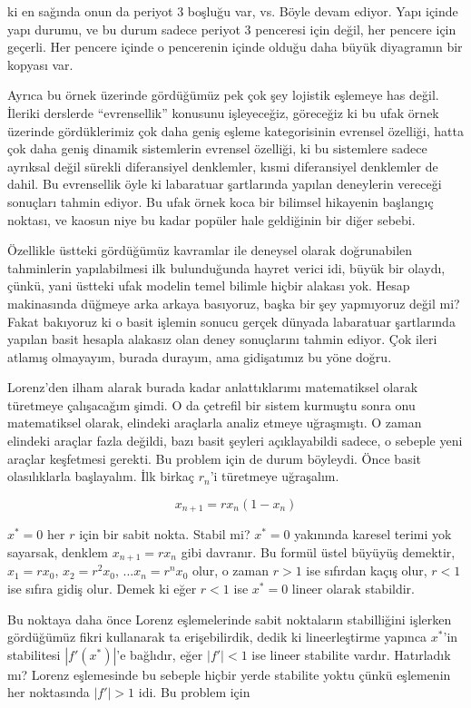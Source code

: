 \documentclass[12pt,fleqn]{article}\usepackage{../../common}
\begin{document}
ki en sağında onun da periyot 3 boşluğu var, vs. Böyle devam ediyor. Yapı
içinde yapı durumu, ve bu durum sadece periyot 3 penceresi için değil, her
pencere için geçerli. Her pencere içinde o pencerenin içinde olduğu daha
büyük diyagramın bir kopyası var. 

Ayrıca bu örnek üzerinde gördüğümüz pek çok şey lojistik eşlemeye has
değil. İleriki derslerde ``evrensellik'' konusunu işleyeceğiz, göreceğiz ki
bu ufak örnek üzerinde gördüklerimiz çok daha geniş eşleme kategorisinin
evrensel özelliği, hatta çok daha geniş dinamik sistemlerin evrensel
özelliği, ki bu sistemlere sadece ayrıksal değil sürekli diferansiyel
denklemler, kısmi diferansiyel denklemler de dahil. Bu evrensellik öyle ki
labaratuar şartlarında yapılan deneylerin vereceği sonuçları tahmin
ediyor. Bu ufak örnek koca bir bilimsel hikayenin başlangıç noktası, ve
kaosun niye bu kadar popüler hale geldiğinin bir diğer sebebi. 

Özellikle üstteki gördüğümüz kavramlar ile deneysel olarak doğrunabilen
tahminlerin yapılabilmesi ilk bulunduğunda hayret verici idi, büyük bir
olaydı, çünkü, yani üstteki ufak modelin temel bilimle hiçbir alakası
yok. Hesap makinasında düğmeye arka arkaya basıyoruz, başka bir şey
yapmıyoruz değil mi? Fakat bakıyoruz ki o basit işlemin sonucu gerçek
dünyada labaratuar şartlarında yapılan basit hesapla alakasız olan deney
sonuçlarını tahmin ediyor. Çok ileri atlamış olmayayım, burada durayım, ama
gidişatımız bu yöne doğru.

Lorenz'den ilham alarak burada kadar anlattıklarımı matematiksel olarak
türetmeye çalışacağım şimdi. O da çetrefil bir sistem kurmuştu sonra onu
matematiksel olarak, elindeki araçlarla analiz etmeye uğraşmıştı. O zaman
elindeki araçlar fazla değildi, bazı basit şeyleri açıklayabildi sadece, o
sebeple yeni araçlar keşfetmesi gerekti. Bu problem için de durum
böyleydi. Önce basit olasılıklarla başlayalım. İlk birkaç $r_n$'i türetmeye
uğraşalım.

$$ x_{n+1} = r x_n (1-x_n) $$

$x^*=0$ her $r$ için bir sabit nokta. Stabil mi? $x^*=0$ yakınında karesel
terimi yok sayarsak, denklem $x_{n+1} = r x_n$ gibi davranır. Bu formül
üstel büyüyüş demektir, $x_1=rx_0$, $x_2=r^2x_0$, ...$x_n=r^n x_0$  olur, o
zaman $r>1$ ise sıfırdan kaçış olur, $r<1$ ise sıfıra gidiş olur. Demek ki
eğer $r<1$ ise $x^*=0$ lineer olarak stabildir. 

Bu noktaya daha önce Lorenz eşlemelerinde sabit noktaların stabilliğini
işlerken gördüğümüz fikri kullanarak ta erişebilirdik, dedik ki
lineerleştirme yapınca $x^*$'in stabilitesi $|f'(x^*)|$'e bağlıdır, eğer
$|f'| < 1$ ise lineer stabilite vardır. Hatırladık mı? Lorenz eşlemesinde
bu sebeple hiçbir yerde stabilite yoktu çünkü eşlemenin her noktasında
$|f'| > 1$ idi. Bu problem için
\end{document}
